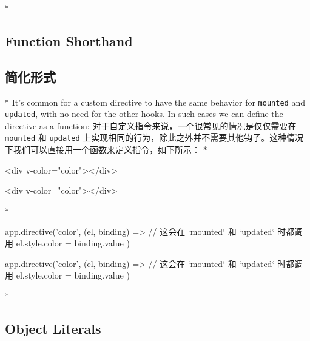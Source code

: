 \begin{paracol}{2}
 
\switchcolumn[0]*%
\subsection{Function Shorthand}
\switchcolumn
\subsection{简化形式}
\switchcolumn[0]*%
It's common for a custom directive to have the same behavior for
\texttt{mounted} and \texttt{updated}, with no need for the other hooks.
In such cases we can define the directive as a function:
\switchcolumn
对于自定义指令来说，一个很常见的情况是仅仅需要在 \texttt{mounted} 和
\texttt{updated}
上实现相同的行为，除此之外并不需要其他钩子。这种情况下我们可以直接用一个函数来定义指令，如下所示：
\switchcolumn[0]*%
\begin{codeHtml}
<div v-color="color"></div>
\end{codeHtml}
\switchcolumn
\begin{codeHtml}
<div v-color="color"></div>
\end{codeHtml}
\switchcolumn[0]*%
\begin{codeJs}
app.directive('color', (el, binding) => {
  // 这会在 `mounted` 和 `updated` 时都调用
  el.style.color = binding.value
})
\end{codeJs}
\switchcolumn
\begin{codeJs}
app.directive('color', (el, binding) => {
  // 这会在 `mounted` 和 `updated` 时都调用
  el.style.color = binding.value
})
\end{codeJs}
\switchcolumn[0]*%
\subsection{Object Literals}
\switchcolumn

\end{paracol}
